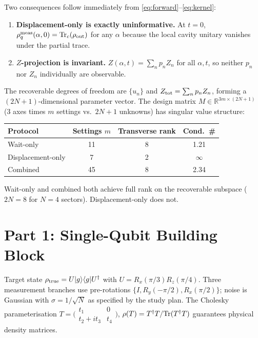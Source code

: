 \documentclass[11pt,onecolumn]{article}
\begin{document}
Two consequences follow immediately from \eqref{eq:forward}--\eqref{eq:kernel}:

\begin{enumerate}
\item \textbf{Displacement-only is exactly uninformative.}  At $t=0$,
  $\rho_q^{\rm meas}(\alpha,0)={\rm Tr}_c(\rho_{\rm out})$ for any $\alpha$
  because the local cavity unitary vanishes under the partial trace.
\item \textbf{$Z$-projection is invariant.}  $Z(\alpha,t)=\sum_n p_n Z_n$
  for all $\alpha,t$, so neither $p_n$ nor $Z_n$ individually are observable.
\end{enumerate}

The recoverable degrees of freedom are $\{u_n\}$ and $Z_{\rm tot}=\sum_n p_n Z_n$,
forming a $(2N+1)$-dimensional parameter vector.  The design matrix
$M\in\mathbb{R}^{3m\times(2N+1)}$ (3 axes times $m$ settings vs.\ $2N+1$ unknowns)
has singular value structure:
\begin{center}
\begin{tabular}{lccc}
\toprule
Protocol & Settings $m$ & Transverse rank & Cond.\ \#\\
\midrule
Wait-only & 11 & 8 & 1.21\\
Displacement-only & 7 & 2 & $\infty$\\
Combined & 45 & 8 & 2.34\\
\bottomrule
\end{tabular}
\end{center}
Wait-only and combined both achieve full rank on the recoverable subspace ($2N=8$
for $N=4$ sectors).  Displacement-only does not.

\section{Part 1: Single-Qubit Building Block}

Target state $\rho_{\rm true}=U|g\rangle\langle g|U^\dagger$ with
$U=R_x(\pi/3)R_z(\pi/4)$.  Three measurement branches use pre-rotations
$\{I,R_y(-\pi/2),R_x(\pi/2)\}$; noise is Gaussian with $\sigma=1/\sqrt{N}$ as
specified by the study plan.  The Cholesky parameterisation
$T=\bigl(\begin{smallmatrix}t_1&0\\t_2+it_3&t_4\end{smallmatrix}\bigr)$,
$\rho(T)=T^\dagger T/{\rm Tr}(T^\dagger T)$ guarantees physical density matrices.
\end{document}

